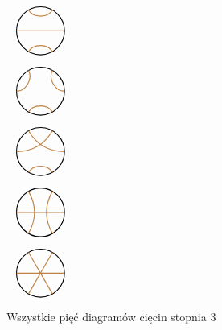 \begin{figure}[H]
    \centering
    \begin{minipage}[b]{.18\linewidth}
        \centering
        $\begin{tikzpicture}[baseline=-0.65ex,scale=0.15]
            \useasboundingbox (-7, -5) rectangle (7, 5);
            \draw[thick] (-0, 0) circle (5);
            \draw[thick, brown] (0:5) to (180:5);
            \draw[thick, brown] (60:5) [in=-60,out=-120] to (120:5);
            \draw[thick, brown] (-60:5) [in=60,out=120] to (-120:5);
        \end{tikzpicture}$
        \subcaption{}
    \end{minipage}
    \begin{minipage}[b]{.18\linewidth}
        \centering
        $\begin{tikzpicture}[baseline=-0.65ex,scale=0.15]
            \useasboundingbox (-7, -5) rectangle (7, 5);
            \draw[thick] (-0, 0) circle (5);
            \draw[thick, brown] (0:5) [in=-120, out=180] to (60:5);
            \draw[thick, brown] (120:5) [in=0, out=-60] to (180:5);
            \draw[thick, brown] (240:5) [in=120, out=60] to (300:5);
        \end{tikzpicture}$
        \subcaption{}
    \end{minipage}
    \begin{minipage}[b]{.18\linewidth}
        \centering
        $\begin{tikzpicture}[baseline=-0.65ex,scale=0.15]
            \useasboundingbox (-7, -5) rectangle (7, 5);
            \draw[thick] (-0, 0) circle (5);
            \draw[thick, brown] (0:5) [out=180, in=-60] to (120:5);
            \draw[thick, brown] (60:5) [in=0,out=-120] to (180:5);
            \draw[thick, brown] (240:5) [in=120, out=60] to (300:5);
        \end{tikzpicture}$
        \subcaption{}
    \end{minipage}
    \begin{minipage}[b]{.18\linewidth}
        \centering
        $\begin{tikzpicture}[baseline=-0.65ex,scale=0.15]
            \useasboundingbox (-7, -5) rectangle (7, 5);
            \draw[thick] (-0, 0) circle (5);
            \draw[thick, brown] (0:5) to (180:5);
            \draw[thick, brown] (60:5) [in=120,out=-120] to (300:5);
            \draw[thick, brown] (120:5) [in=60, out=-60] to (240:5);
        \end{tikzpicture}$
        \subcaption{}
    \end{minipage}
    \begin{minipage}[b]{.18\linewidth}
        \centering
        $\begin{tikzpicture}[baseline=-0.65ex,scale=0.15]
            \useasboundingbox (-7, -5) rectangle (7, 5);
            \draw[thick] (-0, 0) circle (5);
            \draw[thick, brown] (0:5) to (180:5);
            \draw[thick, brown] (60:5) to (240:5);
            \draw[thick, brown] (120:5) to (300:5);
        \end{tikzpicture}$
        \subcaption{}
    \end{minipage}
    \caption{Wszystkie pięć diagramów cięcin stopnia 3}
\end{figure}

